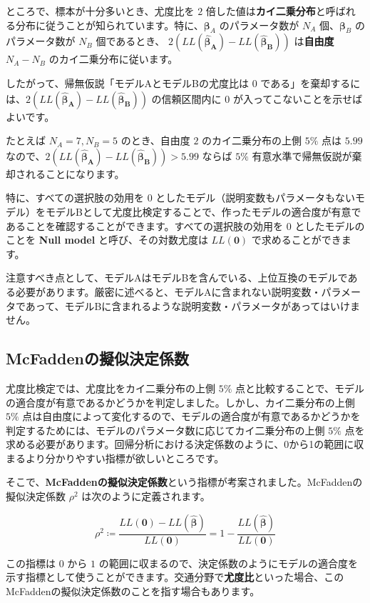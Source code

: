 ところで、標本が十分多いとき、尤度比を $2$ 倍した値は\textbf{カイ二乗分布}と呼ばれる分布に従うことが知られています。特に、$\bm\beta_A$ のパラメータ数が $N_A$ 個、$\bm\beta_B$ のパラメータ数が $N_B$ 個であるとき、 $2(LL(\bm{\hat\beta_A})-LL(\bm{\hat\beta_B}))$ は\textbf{自由度} $N_A-N_B$ のカイ二乗分布に従います。

したがって、帰無仮説「モデルAとモデルBの尤度比は $0$ である」を棄却するには、$2(LL(\bm{\hat\beta_A})-LL(\bm{\hat\beta_B}))$ の信頼区間内に $0$ が入ってこないことを示せばよいです。

たとえば $N_A=7, N_B=5$ のとき、自由度 $2$ のカイ二乗分布の上側 $5\%$ 点は $5.99$ なので、$2(LL(\bm{\hat\beta_A})-LL(\bm{\hat\beta_B}))>5.99$ ならば $5\%$ 有意水準で帰無仮説が棄却されることになります。

特に、すべての選択肢の効用を $0$ としたモデル（説明変数もパラメータもないモデル）をモデルBとして尤度比検定することで、作ったモデルの適合度が有意であることを確認することができます。すべての選択肢の効用を $0$ としたモデルのことを \textbf{Null model} と呼び、その対数尤度は $LL(\bm 0)$ で求めることができます。

注意すべき点として、モデルAはモデルBを含んでいる、上位互換のモデルである必要があります。厳密に述べると、モデルAに含まれない説明変数・パラメータであって、モデルBに含まれるような説明変数・パラメータがあってはいけません。

\subsection{McFaddenの擬似決定係数}

尤度比検定では、尤度比をカイ二乗分布の上側 $5\%$ 点と比較することで、モデルの適合度が有意であるかどうかを判定しました。しかし、カイ二乗分布の上側 $5\%$ 点は自由度によって変化するので、モデルの適合度が有意であるかどうかを判定するためには、モデルのパラメータ数に応じてカイ二乗分布の上側 $5\%$ 点を求める必要があります。回帰分析における決定係数のように、0から1の範囲に収まるより分かりやすい指標が欲しいところです。

そこで、\textbf{McFaddenの擬似決定係数}という指標が考案されました。McFaddenの擬似決定係数 $\rho^2$ は次のように定義されます。

\begin{equation}
    \rho^2 \coloneq \frac{LL(\bm 0)-LL(\bm{\hat\beta})}{LL(\bm 0)} = 1-\frac{LL(\bm{\hat\beta})}{LL(\bm 0)}
\end{equation}

この指標は $0$ から $1$ の範囲に収まるので、決定係数のようにモデルの適合度を示す指標として使うことができます。交通分野で\textbf{尤度比}といった場合、このMcFaddenの擬似決定係数のことを指す場合もあります。

